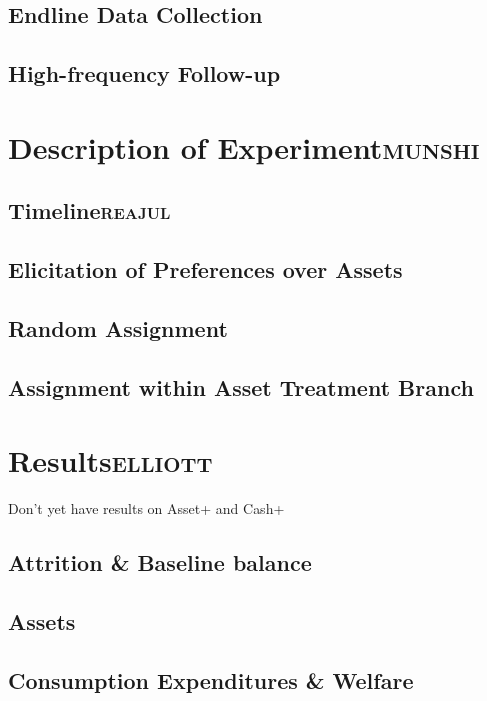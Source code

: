 \documentclass[11pt]{article}
\begin{document}
\subsection{Endline Data Collection}
\label{sec:orgheadline11}
\subsection{High-frequency Follow-up}
\label{sec:orgheadline12}
\section{Description of Experiment\hfill{}\textsc{munshi}}
\label{sec:orgheadline18}
\subsection{Timeline\hfill{}\textsc{reajul}}
\label{sec:orgheadline14}
\subsection{Elicitation of Preferences over Assets}
\label{sec:orgheadline15}
\subsection{Random Assignment}
\label{sec:orgheadline16}
\subsection{Assignment within Asset Treatment Branch}
\label{sec:orgheadline17}
\section{Results\hfill{}\textsc{elliott}}
\label{sec:orgheadline26}

Don't yet have results on Asset+ and Cash+

\subsection{Attrition \& Baseline balance}
\label{sec:orgheadline19}
\subsection{Assets}
\label{sec:orgheadline20}

\subsection{Consumption Expenditures \& Welfare}
\label{sec:orgheadline21}
\end{document}
